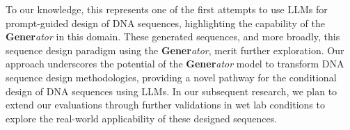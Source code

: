 To our knowledge, this represents one of the first attempts to use LLMs for prompt-guided design of DNA sequences, highlighting the capability of the \textbf{Gener}\textit{ator} in this domain. These generated sequences, and more broadly, this sequence design paradigm using the \textbf{Gener}\textit{ator}, merit further exploration. Our approach underscores the potential of the \textbf{Gener}\textit{ator} model to transform DNA sequence design methodologies, providing a novel pathway for the conditional design of DNA sequences using LLMs. In our subsequent research, we plan to extend our evaluations through further validations in wet lab conditions to explore the real-world applicability of these designed sequences.






